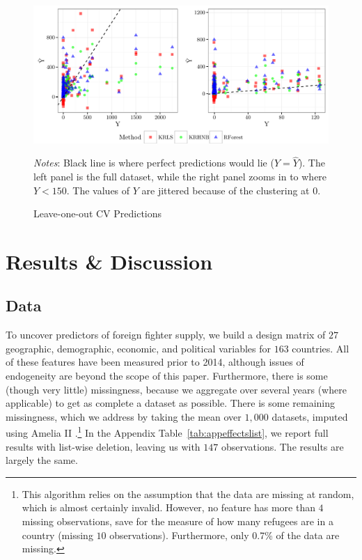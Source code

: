 \documentclass[12pt]{article}
\begin{document}
\begin{figure}[!htb]
	\centering
	\includegraphics[width=0.95\linewidth]{tabs_figs/predictJoin.pdf}
	\caption{Leave-one-out CV Predictions}	\label{fig:predictions} 
	\begin{flushleft} \footnotesize \textit{Notes}: Black line is where perfect predictions would lie ($Y = \hat{Y}$). The left panel is the full dataset, while the right panel zooms in to where $Y < 150$. The values of $Y$ are jittered because of the clustering at 0. \end{flushleft}
\end{figure}

\section{Results \& Discussion}	\label{sec:results} 	

\subsection{Data}

To uncover predictors of foreign fighter supply, we build a design matrix of $27$ geographic, demographic, economic, and political variables for $163$ countries. All of these features have been measured prior to 2014, although issues of endogeneity are beyond the scope of this paper. Furthermore, there is some (though very little) missingness, because we aggregate over several years (where applicable) to get as complete a dataset as possible. There is some remaining missingness, which we address by taking the mean over $1,000$ datasets, imputed using Amelia II \citep{Honaker2011}.\footnote{This algorithm relies on the assumption that the data are missing at random, which is almost certainly invalid. However, no feature has more than $4$ missing observations, save for the measure of how many refugees are in a country (missing $10$ observations). Furthermore, only 0.7\% of the data are missing.} In the Appendix Table~\ref{tab:appeffectslist}, we report full results with list-wise deletion, leaving us with $147$ observations. The results are largely the same.		\\
\end{document}
